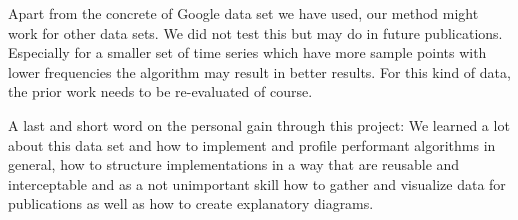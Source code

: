Apart from the concrete of Google data set we have used, our method might work for other data sets. We did not test this but may do in future publications. Especially for a smaller set of time series which have more sample points with lower frequencies the algorithm may result in better results. For this kind of data, the prior work needs to be re-evaluated of course.

A last and short word on the personal gain through this project: We learned a lot about this data set and how to implement and profile performant algorithms in general, how to structure implementations in a way that are reusable and interceptable and as a not unimportant skill how to gather and visualize data for publications as well as how to create explanatory diagrams.
